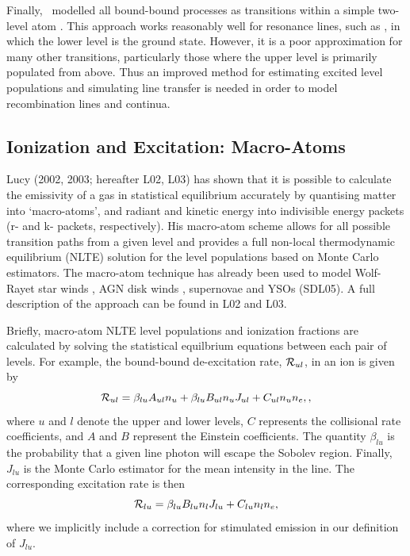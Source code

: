 \documentclass[preprint, a4paper, 11pt]{aastex}
\begin{document}
Finally, \py\ modelled all bound-bound processes as transitions
within a simple two-level atom \cite[see e.g.][]{mihalas}. This
approach works reasonably well for resonance  
lines, such as \civfull, in which the lower level is the ground state.  
However, it is a poor approximation for many other
transitions, particularly those where the upper level
is primarily populated from above. Thus an improved method for
estimating excited level populations and simulating line transfer is
needed in order to model recombination lines and continua.

\subsection{Ionization and Excitation: Macro-Atoms}

Lucy (2002, 2003\nocite{lucy2002, lucy2003}; hereafter L02, L03) 
has shown that it is possible to calculate the emissivity of a gas in
statistical equilibrium accurately by quantising matter into
`macro-atoms', and radiant and kinetic energy into indivisible energy
packets (r- and k- packets, respectively). His macro-atom scheme
allows for all possible transition paths from a given level and
provides a full non-local thermodynamic equilibrium (NLTE) solution
for the level populations based on Monte Carlo estimators. The macro-atom
technique has already been used to model Wolf-Rayet star
winds \citep{sim2004}, AGN disk winds \citep{simlong2008, tatum2012},
supernovae \citep{kasen2006, kerzendorfsim} and YSOs (SDL05). A full 
description of the approach can be found in L02 and L03. 

Briefly, macro-atom NLTE level populations and ionization fractions
are calculated by solving the statistical equilbrium equations between
each pair of levels. For example, the bound-bound de-excitation rate,
${\cal R}_{ul}$, in an ion is given by  
\begin{equation}
{\cal R}_{ul} = \beta_{lu} A_{ul} n_u + \beta_{lu} B_{ul} n_u J_{ul} +
C_{ul} n_u n_e,\label{eq:nlte_rul},
\end{equation}
where $u$ and $l$ denote the upper and lower levels, $C$ represents the
collisional rate coefficients, and $A$ and $B$ represent the Einstein
coefficients. The quantity $\beta_{lu}$ is the probability that a
given line photon will escape the Sobolev region. Finally, $J_{lu}$ is the
Monte Carlo estimator for the mean intensity in the line. 
The corresponding excitation rate is then 
\begin{equation}
{\cal R}_{lu} = \beta_{lu} B_{lu} n_l J_{lu} + C_{lu} n_l n_e,
\end{equation}
where we implicitly include a correction for stimulated emission in
our definition of $J_{lu}$. 
\end{document}
